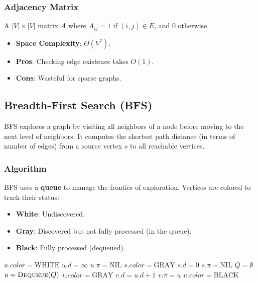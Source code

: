 \documentclass[12pt]{article}
\theoremstyle{blueplain}
\theoremstyle{bluedef}
\theoremstyle{blueremark}
\begin{document}
\subsubsection{Adjacency Matrix}
A $|V| \times |V|$ matrix $A$ where $A_{ij} = 1$ if $(i, j) \in E$, and 0 otherwise.
\begin{itemize}
    \item \textbf{Space Complexity}: $\Theta(V^2)$.
    \item \textbf{Pros}: Checking edge existence takes $O(1)$.
    \item \textbf{Cons}: Wasteful for sparse graphs.
\end{itemize}


\subsection{Breadth-First Search (BFS)}

BFS explores a graph by visiting all neighbors of a node before moving to the next level of neighbors. It computes the shortest path distance (in terms of number of edges) from a source vertex $s$ to all reachable vertices.

\subsubsection{Algorithm}
BFS uses a \textbf{queue} to manage the frontier of exploration. Vertices are colored to track their status:
\begin{itemize}
    \item \textbf{White}: Undiscovered.
    \item \textbf{Gray}: Discovered but not fully processed (in the queue).
    \item \textbf{Black}: Fully processed (dequeued).
\end{itemize}

\begin{algorithm}
    \caption{Breadth-First Search}\label{alg:bfs}
    \begin{algorithmic}[1]
        \State $u.color = \text{WHITE}$
        \State $u.d = \infty$
        \State $u.\pi = \text{NIL}$
        \EndFor
        \State $s.color = \text{GRAY}$
        \State $s.d = 0$
        \State $s.\pi = \text{NIL}$
        \State $Q = \emptyset$
        \State {}
        \State $u = \Call{Dequeue}{Q}$
        \State $v.color = \text{GRAY}$
        \State $v.d = u.d + 1$
        \State $v.\pi = u$
        \State {}
        \EndIf
        \EndFor
        \State $u.color = \text{BLACK}$
        \EndWhile
        \EndProcedure
    \end{algorithmic}
\end{algorithm}
\end{document}
